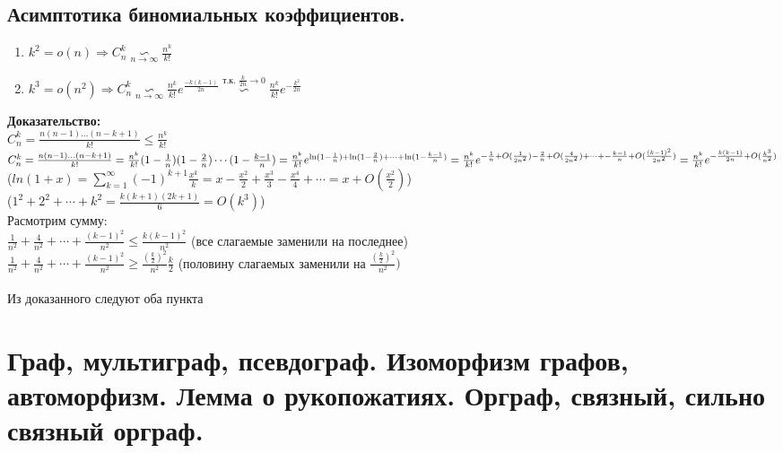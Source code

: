 \documentclass[12pt]{article}
\begin{document}
\subsection{Асимптотика биномиальных коэффициентов.}
\begin{enumerate}
	\item $k^2 = o(n) \Rightarrow C_n^k \underset{n\to\infty}{\backsim} \frac{n^k}{k!}$
	\item $k^3 = o(n^2) \Rightarrow C_n^k \underset{n\to\infty}{\backsim} \frac{n^k}{k!}e^{\frac{-k(k-1)}{2n}} \overset{\text{т.к. $\frac{k}{2n} \to 0$}}{\backsim} \frac{n^k}{k!}e^{-\frac{k^2}{2n}}$
\end{enumerate}
	\textbf{Доказательство:}\\
		$C_n^k = \frac{n(n-1)\dotsc(n-k+1)}{k!} \leqslant \frac{n^k}{k!}$\\
		$C_n^k = \frac{n(n-1)\dotsc(n-k+1)}{k!} = \frac{n^k}{k!}(1-\frac{1}{n})(1-\frac{2}{n})\dotsm(1-\frac{k-1}{n}) = 
		\frac{n^k}{k!}e^{\ln(1-\frac{1}{n}) + \ln(1 - \frac{2}{n}) + \dotsb + \ln(1 - \frac{k-1}{n})} =\\
		\frac{n^k}{k!}e^{-\frac{1}{n} + O(\frac{1}{2n^2}) - \frac{2}{n} + O(\frac{4}{2n^2}) + \dotsb + -\frac{k-1}{n} + O(\frac{(k-1)^2}{2n^2})} =
		\frac{n^k}{k!}e^{-\frac{k(k-1)}{2n} + O(\frac{k^3}{n^2})}$\\
		($ln(1 + x) = \displaystyle\sum_{k=1}^\infty(-1)^{k+1}\frac{x^k}{k} = x - \frac{x^2}{2} + \frac{x^3}{3} - \frac{x^4}{4} + \dotsb = x + O(\frac{x^2}{2})$)\\
		($1^2 + 2^2 + \dotsb + k^2 = \frac{k(k+1)(2k+1)}{6} = O(k^3)$)\\

		Расмотрим сумму:\\
		$\frac{1}{n^2} + \frac{4}{n^2} + \dotsb + \frac{(k-1)^2}{n^2} \leqslant \frac{k(k-1)^2}{n^2}$ \quad (все слагаемые заменили на последнее)\\
		$\frac{1}{n^2} + \frac{4}{n^2} + \dotsb + \frac{(k-1)^2}{n^2} \geqslant \frac{(\frac{k}{2})^2}{n^2}\frac{k}{2}$ \quad (половину слагаемых заменили на $\frac{(\frac{k}{2})^2}{n^2})$\\\\
		Из доказанного следуют оба пункта\\
	\qedsymbol

\section{Граф, мультиграф, псевдограф. Изоморфизм графов, автоморфизм. Лемма о рукопожатиях. Орграф, связный, сильно связный орграф.}
\end{document}

